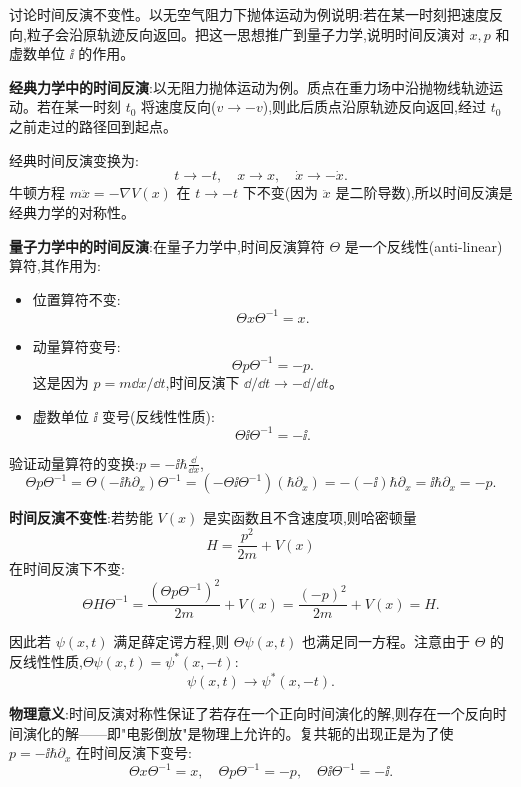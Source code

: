 \begin{question}
讨论时间反演不变性。以无空气阻力下抛体运动为例说明:若在某一时刻把速度反向,粒子会沿原轨迹反向返回。把这一思想推广到量子力学,说明时间反演对 $x,p$ 和虚数单位 $\ii$ 的作用。
\end{question}
\begin{solution}
	\textbf{经典力学中的时间反演}:以无阻力抛体运动为例。质点在重力场中沿抛物线轨迹运动。若在某一时刻 $t_0$ 将速度反向($v\to -v$),则此后质点沿原轨迹反向返回,经过 $t_0$ 之前走过的路径回到起点。

	经典时间反演变换为:
	\[
	t \to -t,\quad x \to x,\quad \dot x \to -\dot x.
	\]
	牛顿方程 $m\ddot x = -\nabla V(x)$ 在 $t\to -t$ 下不变(因为 $\ddot x$ 是二阶导数),所以时间反演是经典力学的对称性。

	\textbf{量子力学中的时间反演}:在量子力学中,时间反演算符 $\Theta$ 是一个反线性(anti-linear)算符,其作用为:
	\begin{itemize}
	\item 位置算符不变:
	\[
	\Theta x\Theta^{-1} = x.
	\]
	\item 动量算符变号:
	\[
	\Theta p\Theta^{-1} = -p.
	\]
	这是因为 $p=m\dd x/\dd t$,时间反演下 $\dd/\dd t \to -\dd/\dd t$。
	\item 虚数单位 $\ii$ 变号(反线性性质):
	\[
	\Theta \ii\Theta^{-1} = -\ii.
	\]
	\end{itemize}

	验证动量算符的变换:$p = -\ii\hbar\frac{\dd}{\dd x}$,
	\[
	\Theta p \Theta^{-1} = \Theta(-\ii\hbar\partial_x)\Theta^{-1}
	= (-\Theta\ii\Theta^{-1})(\hbar\partial_x) = -(-\ii)\hbar\partial_x = \ii\hbar\partial_x = -p.
	\]

	\textbf{时间反演不变性}:若势能 $V(x)$ 是实函数且不含速度项,则哈密顿量
	\[
	H = \frac{p^2}{2m} + V(x)
	\]
	在时间反演下不变:
	\[
	\Theta H \Theta^{-1} = \frac{(\Theta p\Theta^{-1})^2}{2m} + V(x)
	= \frac{(-p)^2}{2m} + V(x) = H.
	\]

	因此若 $\psi(x,t)$ 满足薛定谔方程,则 $\Theta\psi(x,t)$ 也满足同一方程。注意由于 $\Theta$ 的反线性性质,$\Theta\psi(x,t) = \psi^*(x,-t)$:
	\[
	\psi(x,t) \to \psi^*(x,-t).
	\]

	\textbf{物理意义}:时间反演对称性保证了若存在一个正向时间演化的解,则存在一个反向时间演化的解——即"电影倒放"是物理上允许的。复共轭的出现正是为了使 $p=-\ii\hbar\partial_x$ 在时间反演下变号:
	\[
	\boxed{\Theta x\Theta^{-1}=x,\quad \Theta p\Theta^{-1}=-p,\quad \Theta\ii\Theta^{-1}=-\ii}.
	\]
	\end{solution}

